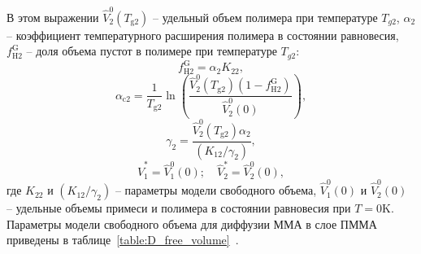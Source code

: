 В этом выражении $\hat{V}_2^0\left(T_{\mathrm{g} 2}\right)$ -- удельный объем полимера при температуре $T_{g2}$, \linebreak $\alpha_2$ -- коэффициент температурного расширения полимера в состоянии равновесия, $f_{\mathrm{H} 2}^{\mathrm{G}}$ -- доля объема пустот в полимере при температуре $T_{g2}$:
\begin{equation}
	f_{\mathrm{H} 2}^{\mathrm{G}}=\alpha_2 K_{22},
\end{equation}
\begin{equation}
	\alpha_{\mathrm{c} 2}=\frac{1}{T_{\mathrm{g} 2}} \ln \left(\frac{\hat{V}_2^0\left(T_{\mathrm{g} 2}\right)\left(1-f_{\mathrm{H} 2}^{\mathrm{G}}\right)}{\hat{V}_2^0(0)}\right),
\end{equation}
\begin{equation}
	\gamma_2=\frac{\hat{V}_2^0\left(T_{\mathrm{g} 2}\right) \alpha_2}{\left(K_{12} / \gamma_2\right)},
\end{equation}
\begin{equation}
	\hat{V}_1^*=\hat{V}_1^0(0); \hspace{1em} \hat{V}_2^*=\hat{V}_2^0(0),
\end{equation}
где $K_{22}$ и $\left(K_{12} / \gamma_2\right)$ -- параметры модели свободного объема, $\hat{V}_1^0(0)$ и $\hat{V}_2^0(0)$ -- удельные объемы примеси и полимера в состоянии равновесия при $T=0$K. Параметры модели свободного объема для диффузии ММА в слое ПММА приведены в таблице~\ref{table:D_free_volume}~\cite{Tonge_free_volume_parameters}.

